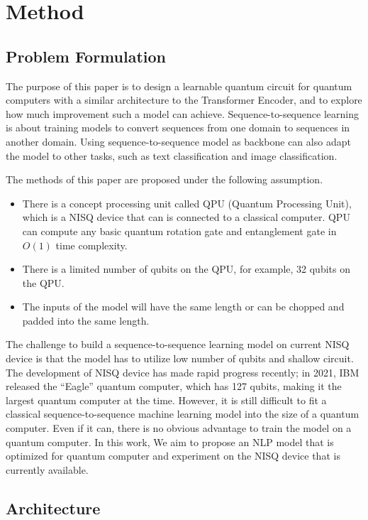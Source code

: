 \section{Method}

\subsection{Problem Formulation}

The purpose of this paper is to design a learnable quantum circuit for quantum computers with a similar architecture to the Transformer Encoder, and to explore how much improvement such a model can achieve.
Sequence-to-sequence learning is about training models to convert sequences from one domain to sequences in another domain. Using sequence-to-sequence model as backbone can also adapt the model to other tasks, such as text classification and image classification.

The methods of this paper are proposed under the following assumption.
\begin{itemize}
  \item There is a concept processing unit called QPU (Quantum Processing Unit), which is a NISQ device that can is connected to a classical computer. QPU can compute any basic quantum rotation gate and entanglement gate in $O(1)$ time complexity.
  \item There is a limited number of qubits on the QPU, for example, 32 qubits on the QPU.
  \item The inputs of the model will have the same length or can be chopped and padded into the same length.
\end{itemize}

The challenge to build a sequence-to-sequence learning model on current NISQ device is that the model has to utilize low number of qubits and shallow circuit. The development of NISQ device has made rapid progress recently; in 2021, IBM released the “Eagle” quantum computer, which has 127 qubits, making it the largest quantum computer at the time. However, it is still difficult to fit a classical sequence-to-sequence machine learning model into the size of a quantum computer. Even if it can, there is no obvious advantage to train the model on a quantum computer. In this work, We aim to propose an NLP model that is optimized for quantum computer and experiment on the NISQ device that is currently available.

\subsection{Architecture}

